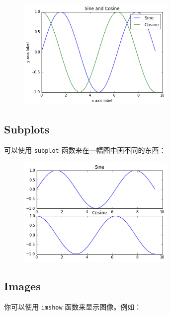 \begin{frame}

\begin{figure}[htbp]
        \centering
        \includegraphics[width=3in]{images/sine_cosine.png}
\end{figure}

\end{frame}

\subsection{Subplots}
\begin{frame}



可以使用 \lstinline|subplot| 函数来在一幅图中画不同的东西：  


\end{frame}

\begin{frame}

\begin{figure}[htbp]
        \centering
        \includegraphics[width=3in]{images/sine_cosine_subplot.png}
\end{figure}
\end{frame}

\subsection{Images}
\begin{frame}

你可以使用 \lstinline|imshow| 函数来显示图像。例如： 

\end{frame}

